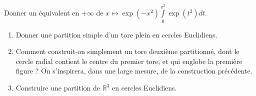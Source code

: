 \begin{exer}
Donner un \'equivalent en $+ \infty$ de $x \mapsto \exp(-x^2) \int\limits_0^{x^2} \exp(t^2) dt$.
\end{exer}

\begin{exer}
\begin{enumerate}
\item Donner une partition simple d'un tore plein en cercles Euclidiens.
\item Comment construit-on simplement un tore deuxième partitionné, %
dont le cercle radial contient le centre du premier tore, et qui englobe la première figure ? %
On s'inspirera, dans une large mesure, de la construction précédente.
\item Construire une partition de $\mathbb{R}^3$ en cercles Euclidiens.
\end{enumerate}
\end{exer}